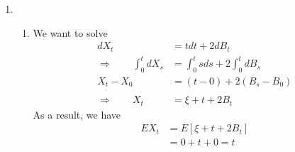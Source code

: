 \documentclass[12pt]{article}
\theoremstyle{plain}
\theoremstyle{definition}
\theoremstyle{remark}
\begin{document}
\begin{enumerate}
\begin{enumerate}
    \end{enumerate}

  \item %
    \begin{enumerate}
      \item %
        We want to solve
        \begin{align*}
          dX_t &= t dt + 2 dB_t \\
          \Rightarrow \qquad
          \int^t_0 dX_s &= \int^t_0 s ds + 2 \int^t_0 dB_s \\
          X_t - X_0 &= (t-0) + 2 (B_s - B_0) \\\\
          \Rightarrow \qquad
          X_t &= \xi + t + 2B_t
        \end{align*}
        As a result, we have
        \begin{align*}
          EX_t &= E\left[ \xi + t + 2B_t \right] \\
          &= 0 + t + 0 = t
        \end{align*}


\end{enumerate}
\end{enumerate}
\end{document}
